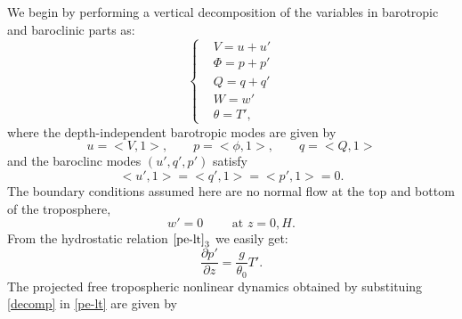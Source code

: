 \documentclass[11pt, a4paper, article,reqno,]{amsart}
\theoremstyle{remark}
\numberwithin{equation}{section}
\begin{document}
We begin by performing a vertical decomposition of the variables in barotropic and baroclinic parts as:
\begin{equation}\label{decomp}
\left\{\begin{aligned}
    & V = u+ u' \\
    & \Phi = p + p' \\
    & Q= q+ q' \\
    & W = w' \\
    & \theta = T',
    \end{aligned}\right.
\end{equation}
where the depth-independent barotropic modes  are given by
\begin{equation*}
    u = < V, 1> ,\qquad p = < \phi, 1>,\qquad q = < Q, 1>
\end{equation*}
and  the baroclinc modes $(u',q',p')$ satisfy
\begin{equation*}
    < u', 1> =< q',1> = < p',1>= 0.
\end{equation*} 
The boundary conditions assumed here are no normal flow at the top and bottom of the troposphere, 
\begin{equation}
w'=0 \qquad \text{ at } z=0, H.
\end{equation}
From the hydrostatic relation $\eqref{pe-lt}_3$ we easily get:
\begin{equation}\label{newhydro}
    \frac{\partial p'}{\partial z} = \frac{g}{\theta_0} T'.
\end{equation}
The projected free tropospheric nonlinear dynamics obtained by substituing \eqref{decomp} in \eqref{pe-lt} are given by
\end{document}
